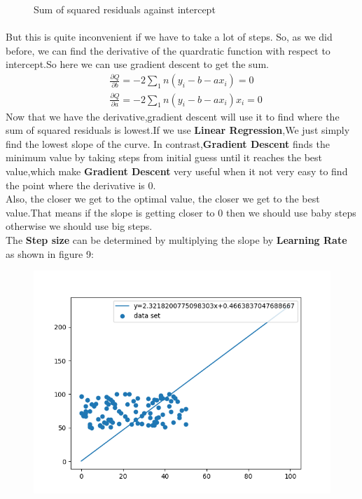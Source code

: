 \documentclass[a4paper,12pt]{article}
\begin{document}
\begin{spacing}{2}
\begin{figure}[h]
\caption{Sum of squared residuals against intercept}
\label{Sum of squared residuals against intercept}
\end{figure}
\paragraph{ } But this is quite inconvenient if we have to take a lot of steps. So, as we did before, we can find the derivative of the quardratic function with respect to intercept.So here we can use gradient descent to get the sum.
\begin{align}
&\frac{\partial Q}{\partial b}=-2\sum_{1}n(y_{i}-b-ax_{i})=0\\
&\frac{\partial Q}{\partial a}=-2\sum_{1}n(y_{i}-b-ax_{i})x_{i}=0
\end{align}
Now that we have the derivative,gradient descent will use it to find where the sum of squared residuals is lowest.If we use \textbf{Linear Regression},We just simply find the lowest slope of the curve. In contrast,\textbf{Gradient Descent} finds the minimum value by taking steps from initial guess until it reaches the best value,which make \textbf{Gradient Descent} very useful when it not very easy to find the point where the derivative is 0.\\
Also, the closer we get to the optimal value, the closer we get to the best value.That means if the slope is getting closer to 0 then we should use baby steps otherwise we should use big steps.\\
The \textbf{Step size} can be determined by multiplying the slope by \textbf{Learning Rate} as shown in figure 9:
\begin{figure}
\centering
\includegraphics[scale=0.5]{Figure_9.png}

\end{figure}
\end{spacing}
\end{document}
